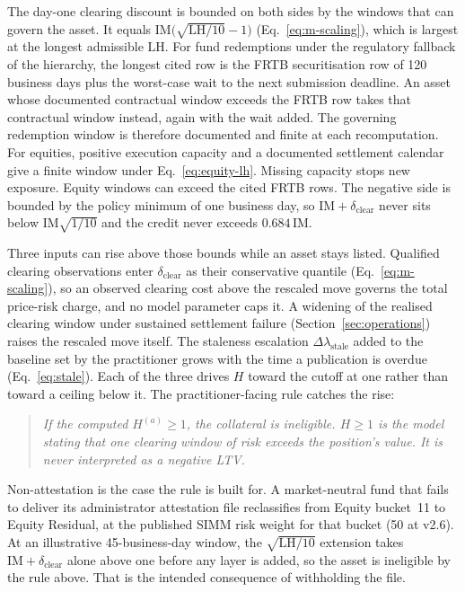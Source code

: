 The day-one clearing discount is bounded on both sides by the windows that can govern the asset. It equals $\mathrm{IM}\bigl(\sqrt{\mathrm{LH}/10}-1\bigr)$ (Eq.~\eqref{eq:m-scaling}), which is largest at the longest admissible $\mathrm{LH}$. For fund redemptions under the regulatory fallback of the hierarchy, the longest cited row is the FRTB securitisation row of 120 business days plus the worst-case wait to the next submission deadline. An asset whose documented contractual window exceeds the FRTB row takes that contractual window instead, again with the wait added. The governing redemption window is therefore documented and finite at each recomputation. For equities, positive execution capacity and a documented settlement calendar give a finite window under Eq.~\eqref{eq:equity-lh}. Missing capacity stops new exposure. Equity windows can exceed the cited FRTB rows. The negative side is bounded by the policy minimum of one business day, so $\mathrm{IM}+\delta_{\mathrm{clear}}$ never sits below $\mathrm{IM}\sqrt{1/10}$ and the credit never exceeds $0.684\,\mathrm{IM}$.

Three inputs can rise above those bounds while an asset stays listed. Qualified clearing
observations enter $\delta_{\mathrm{clear}}$ as their conservative quantile
(Eq.~\eqref{eq:m-scaling}), so an observed clearing
cost above the rescaled move governs the total price-risk charge, and no model parameter caps it.
A widening of the realised clearing window under sustained
settlement failure (Section~\ref{sec:operations}) raises the rescaled move itself. The staleness
escalation $\Delta\lambda_{\mathrm{stale}}$ added to the baseline set by the practitioner grows with the
time a publication is overdue (Eq.~\eqref{eq:stale}). Each of the three drives $H$
toward the cutoff at one rather than toward a ceiling below it. The practitioner-facing
rule catches the rise:
\begin{quote}
\emph{If the computed $H^{(a)}\ge 1$, the collateral is ineligible. $H\ge 1$ is the
model stating that one clearing window of risk exceeds the position's value. It is
never interpreted as a negative LTV.}
\end{quote}

Non-attestation is the case the rule is built for. A market-neutral fund that fails to
deliver its administrator attestation file
reclassifies from Equity bucket~11 to Equity Residual, at the published SIMM risk
weight for that bucket (50 at v2.6). At an illustrative 45-business-day window, the
$\sqrt{\mathrm{LH}/10}$ extension takes $\mathrm{IM}+\delta_{\mathrm{clear}}$ alone above
one before any layer is added, so the asset is ineligible by the rule above. That is the
intended consequence of withholding the file.

